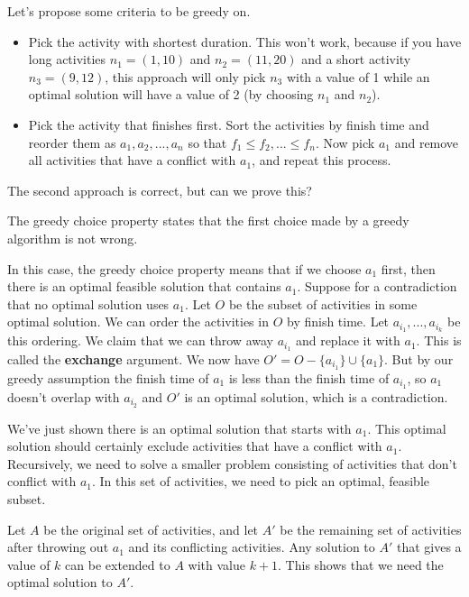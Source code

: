 Let's propose some criteria to be greedy on.

\begin{itemize}
    \item Pick the activity with shortest duration. This won't work,
    because if you have long activities $n_1 = (1, 10)$ and $n_2 = 
    (11,
    20)$ and a short activity $n_3 = (9, 12)$, this approach will
    only pick $n_3$ with a value of 1 while an optimal solution will
    have a value of 2 (by choosing $n_1$ and $n_2$).
    \item  Pick the activity that finishes first. Sort the activities
    by finish time and reorder them as $a_1, a_2, ..., a_n$ so that
    $f_1 \leq f_2, ... \leq f_n$. Now pick $a_1$ and remove all
    activities that have a conflict with $a_1$, and repeat this
    process.
\end{itemize}

The second approach is correct, but can we prove this? 

\begin{definition}
    The greedy choice property states that the
first choice made by a greedy algorithm is not wrong.
\end{definition}

In this case, the greedy choice property means that if we
choose $a_1$ first, then there is an optimal
feasible solution that contains $a_1$. Suppose for a contradiction
that no optimal solution uses $a_1$. Let $O$ be the subset of
activities in some optimal solution. We can order the activities in
$O$ by finish time. Let $a_{i_1}, ..., a_{i_k}$ be this ordering.
We claim that we can throw away $a_{i_1}$ and replace it with $a_1$.
This is called the \textbf{exchange} argument. We now have $O' = O -
\{a_{i_1}\} \cup \{a_1\}$. But by our greedy assumption the finish
time of $a_1$ is less than the finish time of $a_{i_1}$, so $a_1$
doesn't overlap with $a_{i_2}$ and $O'$ is an optimal solution, which
is a contradiction.

We've just shown there is an optimal solution that starts with $a_1$.
This optimal solution should certainly exclude activities that have a
conflict with $a_1$. Recursively, we need to solve a smaller problem
consisting of activities that don't conflict with $a_1$. In this set
of activities, we need to pick an optimal, feasible subset. 

Let $A$ be the original set of activities, and let $A'$ be the
remaining set of activities after throwing out $a_1$ and its
conflicting activities. Any solution to $A'$ that gives a value of $k$
can be extended to $A$ with value $k + 1$. This shows that we need the
optimal solution to $A'$.

